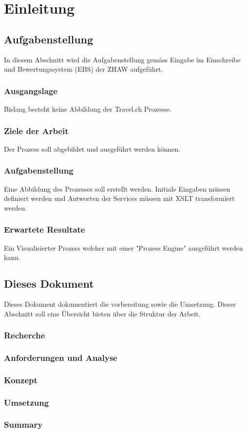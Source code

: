 \chapter{Einleitung}

\section{Aufgabenstellung}
In diesem Abschnitt wird die Aufgabenstellung gemäss Eingabe im Einschreibe und Bewertungssystem (EBS) der ZHAW aufgeführt.

\subsection{Ausgangslage}
Bislang besteht keine Abbildung der Travel.ch Prozesse.

\subsection{Ziele der Arbeit}
\label{sec:desc:targets}
Der Prozess soll abgebildet und ausgeführt werden können.

\subsection{Aufgabenstellung}
Eine Abbildung des Prozesses soll erstellt werden. Initiale Eingaben müssen definiert werden und Antworten der Services müssen mit XSLT transformiert werden.

\subsection{Erwartete Resultate}
Ein Visualisierter Prozess welcher mit einer "Prozess Engine" ausgeführt werden kann.

\section{Dieses Dokument}
Dieses Dokument dokumentiert die vorbereitung sowie die Umsetzung. Dieser Abschnitt soll eine Übersicht bieten über die Struktur der Arbeit.

\subsection{Recherche}

\subsection{Anforderungen und Analyse}

\subsection{Konzept}

\subsection{Umsetzung}

\subsection{Summary}